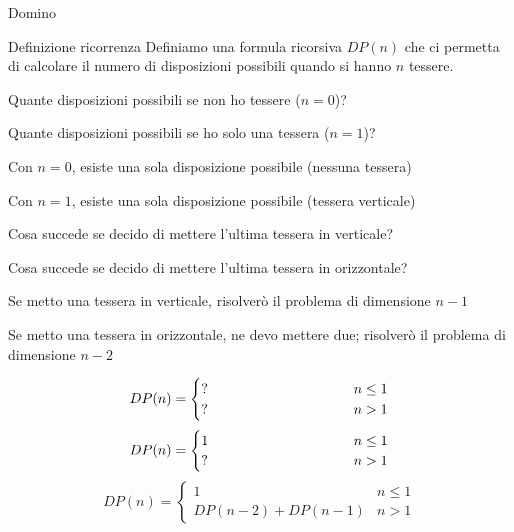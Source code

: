 \begin{frame}{Domino}

\begin{block}{Definizione ricorrenza}
Definiamo una formula ricorsiva $DP(n)$ che ci permetta di calcolare il numero di disposizioni possibili quando si hanno $n$ tessere.
\end{block}

\begin{overprint}
\BIL
\item Quante disposizioni possibili se non ho tessere ($n=0$)?
\item Quante disposizioni possibili se ho solo una tessera ($n=1$)?
\EIL
{}
\BIL
\item Con $n=0$, esiste una sola disposizione possibile (nessuna tessera)
\item Con $n=1$, esiste una sola disposizione possibile (tessera verticale)
\EIL
{}
\BIL
\item Cosa succede se decido di mettere l'ultima tessera in verticale?
\item Cosa succede se decido di mettere l'ultima tessera in orizzontale?
\EI
{}
\BIL
\item Se metto una tessera in verticale, risolverò il problema
di dimensione $n-1$
\item Se metto una tessera in orizzontale, ne devo mettere due; risolverò
il problema di dimensione $n-2$
\EIL
\end{overprint}

\bigskip
\begin{overprint}
\[
DP(n) = \begin{cases}
  ? & n \leq 1 \\
  \makebox[3.5cm][l]{?} & n>1
\end{cases}
\]
\[
DP(n) = \begin{cases}
  1 & n \leq 1 \\
  \makebox[3.5cm][l]{?} & n>1
\end{cases}
\]
\[
DP(n) = \begin{cases}
  1 & n \leq 1 \\
  DP(n-2)+DP(n-1) & n>1
\end{cases}
\]
\end{overprint}

\end{frame}

